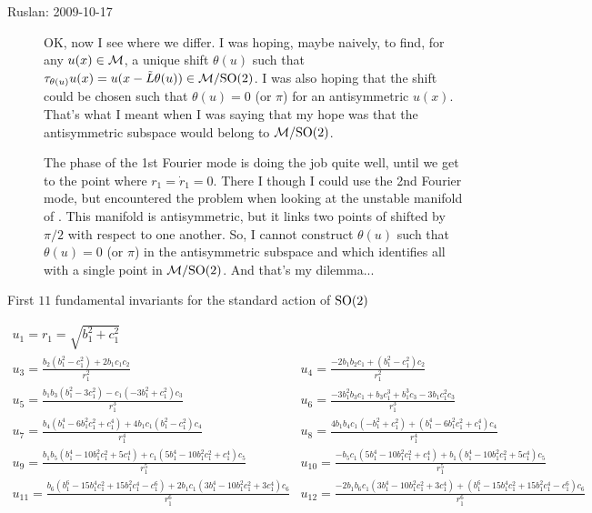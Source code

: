 \begin{description}
\item[Ruslan: 2009-10-17]
OK, now I see where we differ.  I was hoping, maybe naively,
to find, for any $u(x) \in {\cal M}$, a unique shift $\theta(u)$
such that $\tau_{\theta(u)} u(x) = u(x - \tilde{L}\theta(u))
\in {\cal M}/\textrm{SO}(2)$.  I was also hoping that the shift could be
chosen such that $\theta(u) = 0$ (or $\pi$) for an
antisymmetric $u(x)$.  That's what I meant when I was saying
that my hope was that the antisymmetric subspace would belong
to ${\cal M}/\textrm{SO}(2)$.

The phase of the 1st Fourier mode is doing the job quite
well, until we get to the point where $r_1 = \dot{r}_1 = 0$.
There I though I could use the 2nd Fourier mode, but
encountered the problem when looking at the unstable manifold
of .  This manifold is antisymmetric, but it links two
points of  shifted by $\pi/2$ with respect to one
another.  So, I cannot construct $\theta(u)$ such that
$\theta(u) = 0$ (or $\pi$) in the antisymmetric subspace and
which identifies all  with a single point in
${\cal M}/\textrm{SO}(2)$.  And that's my dilemma...


\end{description}


\begin{table}[t]
\caption
{First $11$ fundamental invariants for the standard action
  of $\textrm{SO}(2)$}
\scriptsize
\[
\begin{array}{ll}
  u_1=r_1=\sqrt{b_1^2+c_1^2}&  \\ u_3=\frac{b_2 \left(b_1^2-c_1^2\right)+2 b_1 c_1 c_2}{r_1^2}&u_4=\frac{-2
b_1 b_2 c_1+\left(b_1^2-c_1^2\right) c_2}{r_1^2}\\ u_5=\frac{b_1 b_3 \left(b_1^2-3 c_1^2\right)-c_1 \left(-3
b_1^2+c_1^2\right) c_3}{r_1^3}&u_6=\frac{-3 b_1^2 b_3 c_1+b_3 c_1^3+b_1^3 c_3-3 b_1 c_1^2 c_3}{r_1^3}\\ u_7=\frac{b_4
\left(b_1^4-6 b_1^2 c_1^2+c_1^4\right)+4 b_1 c_1 \left(b_1^2-c_1^2\right) c_4}{r_1^4}&u_8=\frac{4 b_1
b_4 c_1 \left(-b_1^2+c_1^2\right)+\left(b_1^4-6 b_1^2 c_1^2+c_1^4\right) c_4}{r_1^4}\\ u_9=\frac{b_1
b_5 \left(b_1^4-10 b_1^2 c_1^2+5 c_1^4\right)+c_1 \left(5 b_1^4-10 b_1^2 c_1^2+c_1^4\right) c_5}{r_1^5}&u_{10}=\frac{-b_5
c_1 \left(5 b_1^4-10 b_1^2 c_1^2+c_1^4\right)+b_1 \left(b_1^4-10 b_1^2 c_1^2+5 c_1^4\right) c_5}{r_1^5}\\ u_{11}=\frac{b_6
\left(b_1^6-15 b_1^4 c_1^2+15 b_1^2 c_1^4-c_1^6\right)+2 b_1 c_1 \left(3 b_1^4-10 b_1^2 c_1^2+3 c_1^4\right) c_6}{r_1^6}&u_{12}=\frac{-2
b_1 b_6 c_1 \left(3 b_1^4-10 b_1^2 c_1^2+3 c_1^4\right)+\left(b_1^6-15 b_1^4 c_1^2+15 b_1^2 c_1^4-c_1^6\right) c_6}{r_1^6}\\
\end{array}
\]
\label{tab:SO2n6}
\end{table}

